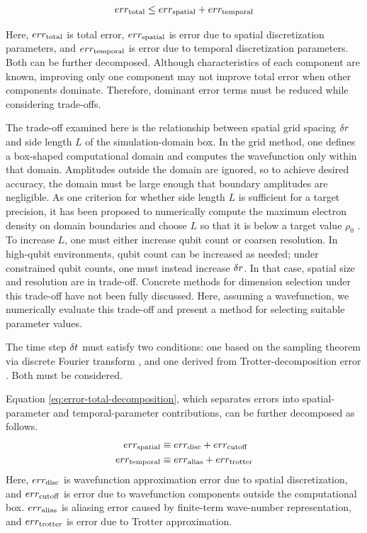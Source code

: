 \documentclass[a4paper,11pt]{article}
\begin{document}
\begin{equation}
err_{\mathrm{total}} \leq err_{\mathrm{spatial}} + err_{\mathrm{temporal}}
\label{eq:error-total-decomposition}
\end{equation}

Here, $err_{\mathrm{total}}$ is total error, $err_{\mathrm{spatial}}$ is error due to spatial
discretization parameters, and $err_{\mathrm{temporal}}$ is error due to temporal
discretization parameters. Both can be further decomposed. Although
characteristics of each component are known, improving only one component may
not improve total error when other components dominate. Therefore, dominant
error terms must be reduced while considering trade-offs.

The trade-off examined here is the relationship between spatial grid spacing
$\delta r$ and side length $L$ of the simulation-domain box. In the grid method,
one defines a box-shaped computational domain and computes the wavefunction only
within that domain. Amplitudes outside the domain are ignored, so to achieve
desired accuracy, the domain must be large enough that boundary amplitudes are
negligible. As one criterion for whether side length $L$ is sufficient for a
target precision, it has been proposed to numerically compute the maximum
electron density on domain boundaries and choose $L$ so that it is below a
target value $\rho_0$ \cite[Supplementary material, S8, A. Space
Cost]{Chan2023.sciadv.abo7484}. To increase $L$, one must either increase qubit
count or coarsen resolution. In high-qubit environments, qubit count can be
increased as needed; under constrained qubit counts, one must instead increase
$\delta r$. In that case, spatial size and resolution are in trade-off.
Concrete methods for dimension selection under this trade-off have not been
fully discussed. Here, assuming a wavefunction, we numerically evaluate this
trade-off and present a method for selecting suitable parameter values.

The time step $\delta t$ must satisfy two conditions: one based on the sampling
theorem via discrete Fourier transform \cite{FEIT1982412}, and one derived from
Trotter-decomposition error
\cite{Childs2021.PhysRevX.11.011020,Burgarth2024.PhysRevResearch.6.043155}.
Both must be considered.

Equation \ref{eq:error-total-decomposition}, which separates errors into spatial-
parameter and temporal-parameter contributions, can be further decomposed as
follows.
\begin{align}
    err_{\mathrm{spatial}} &\equiv err_{\mathrm{disc}} + err_{\mathrm{cutoff}} \\
    err_{\mathrm{temporal}} &\equiv err_{\mathrm{alias}} + err_{\mathrm{trotter}}
\end{align}
Here, $err_{\mathrm{disc}}$ is wavefunction approximation error due to spatial
discretization, and $err_{\mathrm{cutoff}}$ is error due to wavefunction components outside
the computational box. $err_{\mathrm{alias}}$ is aliasing error caused by finite-term
wave-number representation, and $err_{\mathrm{trotter}}$ is error due to Trotter
approximation.
\end{document}

